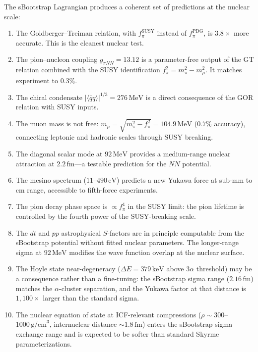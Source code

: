 \documentclass[12pt,a4paper]{article}
\newcommand{\MeV}{\,\text{MeV}}
\newcommand{\eV}{\,\text{eV}}
\newcommand{\keV}{\,\text{keV}}
\newcommand{\fpi}{f_\pi}
\newcommand{\qqbar}{\langle\bar{q}q\rangle}
\begin{document}
The sBootstrap Lagrangian produces a coherent set of predictions at
the nuclear scale:
\begin{enumerate}
\item The Goldberger--Treiman relation, with $\fpi^{\text{SUSY}}$
  instead of $\fpi^{\text{PDG}}$, is $3.8\times$ more accurate.
  This is the cleanest nuclear test.

\item The pion--nucleon coupling $g_{\pi NN} = 13.12$ is a parameter-free
  output of the GT relation combined with the SUSY identification
  $\fpi^2 = m_\pi^2 - m_\mu^2$.  It matches experiment to $0.3\%$.

\item The chiral condensate $|\qqbar|^{1/3} = 276\MeV$ is a direct
  consequence of the GOR relation with SUSY inputs.

\item The muon mass is not free: $m_\mu = \sqrt{m_\pi^2 - \fpi^2}
  = 104.9\MeV$ ($0.7\%$ accuracy), connecting leptonic and hadronic
  scales through SUSY breaking.

\item The diagonal scalar mode at $92\MeV$ provides a medium-range
  nuclear attraction at $2.2\,\text{fm}$---a testable prediction for
  the $NN$ potential.

\item The mesino spectrum ($11$--$490\eV$) predicts a new Yukawa force
  at sub-mm to cm range, accessible to fifth-force experiments.

\item The pion decay phase space is $\propto \fpi^4$ in the SUSY limit:
  the pion lifetime is controlled by the fourth power of the
  SUSY-breaking scale.

\item The $dt$ and $pp$ astrophysical $S$-factors are in principle
  computable from the sBootstrap potential without fitted nuclear
  parameters.  The longer-range sigma at $92\MeV$ modifies the
  wave function overlap at the nuclear surface.

\item The Hoyle state near-degeneracy ($\Delta E = 379\keV$ above
  $3\alpha$ threshold) may be a consequence rather than a fine-tuning:
  the sBootstrap sigma range ($2.16\,\text{fm}$) matches the
  $\alpha$-cluster separation, and the Yukawa factor at that distance
  is $1{,}100\times$ larger than the standard sigma.

\item The nuclear equation of state at ICF-relevant compressions
  ($\rho \sim 300$--$1000\,\text{g/cm}^3$, internuclear distance
  $\sim 1.8\,\text{fm}$) enters the sBootstrap sigma exchange range
  and is expected to be softer than standard Skyrme parameterizations.
\end{enumerate}
\end{document}
